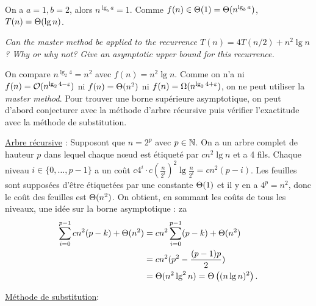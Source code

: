 \begin{description}
    \begin{ex}
       On a $a=1, b=2$, alors $n^{\lg_b a} = 1$. Comme $f(n) \in \Theta(1) = \Theta(n^{\lg_b a})$, $T(n) = \Theta(\lg n)$.
    \end{ex}
  
   {\itshape Can the master method be applied to the recurrence $T(n) = 4T(n/2) + n^2\lg n$ ? Why or why not? Give an asymptotic upper bound for this recurrence.}
    \begin{exrev} %
      On compare $n^{\lg_2 4} = n^2$ avec $f(n) = n^2\lg n$. Comme on n'a ni $f(n) = \mathcal{O}(n^{\lg_2 4 - \varepsilon})$ ni $f(n) = \Theta(n^2)$  ni $f(n) = \Omega(n^{\lg_2 4 + \varepsilon})$, on ne peut utiliser la {\itshape master method}. Pour trouver une borne supérieure asymptotique, on peut d'abord conjecturer avec la méthode d'arbre récursive puis vérifier l'exactitude avec la méthode de substitution.

      \ul{Arbre récursive} : Supposont que $n = 2^p$ avec $p \in \mathbb{N}$. On a un arbre complet de hauteur $p$ dans lequel chaque n\oe ud est étiqueté par $cn^2\lg n$ et a 4 fils. Chaque niveau $i \in \{0, \ldots, p - 1\}$ a un co\^ut $c4^i\cdot c(\frac{n}{2^i})^2\lg \frac{n}{2^i} = cn^2(p - i)$. Les feuilles sont supposées d'\^etre étiquetées par une constante $\Theta(1)$ et il y en a $4^p = n^2$, donc le co\^ut des feuilles est $\Theta(n^2)$. On obtient, en sommant les co\^uts de tous les niveaux, une idée sur la borne asymptotique :
      za\begin{align*}
        \sum_{i=0}^{p-1}cn^2(p-k)+ \Theta(n^2) &= cn^2\sum_{i=0}^{p-1}(p-k) + \Theta(n^2)\\
        &= cn^2(p^2 - \frac{(p-1)p}{2})\\
        &= \Theta(n^2\lg^2 n) = \Theta\left( (n\lg n)^2 \right).
      \end{align*}

    \ul{Méthode de substitution}:
    \end{exrev}
  

\end{description}
